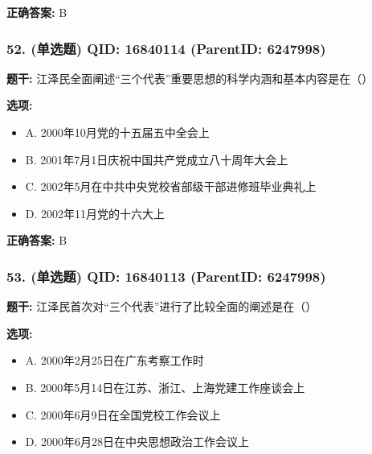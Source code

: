 \documentclass[12pt,UTF8]{ctexart}
\begin{document}
\textbf{正确答案:}
B

\vspace{0.3em}\hrulefill\vspace{0.7em}

\subsubsection*{52. (单选题) \small QID: 16840114 (ParentID: 6247998)}

\textbf{题干:}
江泽民全面阐述“三个代表”重要思想的科学内涵和基本内容是在（）



\textbf{选项:}
\begin{itemize}[leftmargin=*]

  \item A. 2000年10月党的十五届五中全会上

  \item B. 2001年7月1日庆祝中国共产党成立八十周年大会上

  \item C. 2002年5月在中共中央党校省部级干部进修班毕业典礼上

  \item D. 2002年11月党的十六大上

\end{itemize}

\textbf{正确答案:}
B

\vspace{0.3em}\hrulefill\vspace{0.7em}

\subsubsection*{53. (单选题) \small QID: 16840113 (ParentID: 6247998)}

\textbf{题干:}
江泽民首次对“三个代表”进行了比较全面的阐述是在（）



\textbf{选项:}
\begin{itemize}[leftmargin=*]

  \item A. 2000年2月25日在广东考察工作时

  \item B. 2000年5月14日在江苏、浙江、上海党建工作座谈会上

  \item C. 2000年6月9日在全国党校工作会议上

  \item D. 2000年6月28日在中央思想政治工作会议上

\end{itemize}
\end{document}
